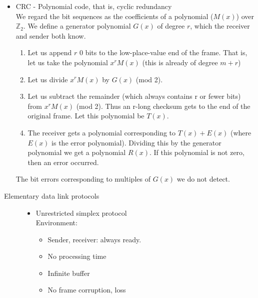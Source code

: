 \documentclass[margin=0px]{article}
\begin{document}
\begin{description}
\begin{itemize}
            \item CRC - Polynomial code, that is, cyclic redundancy \\
                  We regard the bit sequences as the coefficients of a polynomial ($M(x)$) over $\mathbb{Z}_2$. We define a generator polynomial $G(x)$ of degree $r$, which the receiver and sender both know.
                  \begin{enumerate}
                      \item Let us append $r$ 0 bits to the low-place-value end of the frame. That is, let us take the polynomial $x^rM(x)$ (this is already of degree $m+r$)
                      \item Let us divide $x^rM(x)$ by $G(x)$ (mod 2).
                      \item Let us subtract the remainder (which always contains r or fewer bits) from $x^rM(x)$ (mod 2). Thus an r-long checksum gets to the end of the original frame. Let this polynomial be $T(x)$.
                      \item The receiver gets a polynomial corresponding to $T(x)+E(x)$ (where $E(x)$ is the error polynomial). Dividing this by the generator polynomial we get a polynomial $R(x)$. If this polynomial is not zero, then an error occurred.
                  \end{enumerate}
                  The bit errors corresponding to multiples of $G(x)$ we do not detect.
        \end{itemize}
    \item[Protocols] \hfill
        \begin{description}
            \item[Elementary data link protocols] \hfill
                \begin{itemize}
                    \item Unrestricted simplex protocol\\
                          Environment:
                          \begin{itemize}
                              \item Sender, receiver: always ready.
                              \item No processing time
                              \item Infinite buffer
                              \item No frame corruption, loss
                          \end{itemize}


\end{itemize}
\end{description}
\end{description}
\end{document}
